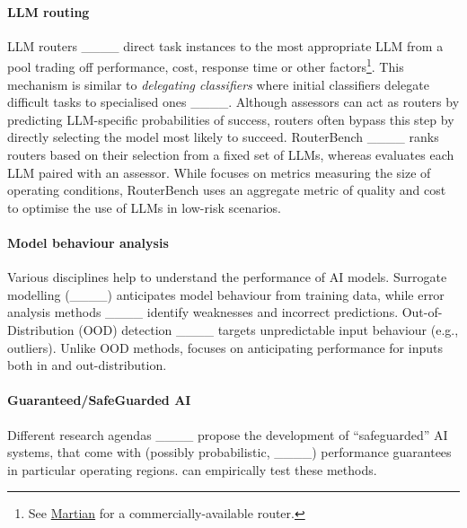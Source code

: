 \paragraph{LLM routing}
LLM routers ____
direct task instances to the most appropriate LLM from a pool 
trading off performance, cost, response time or other factors\footnote{See \href{https://withmartian.com/}{Martian} for a commercially-available router.}.
This mechanism %
is similar to %
\textit{delegating classifiers}  where initial classifiers delegate difficult tasks to %
specialised ones 
____. Although assessors can act %
as routers by predicting LLM-specific probabilities of success, routers often bypass this step by directly selecting the model most likely to succeed. %
RouterBench ____ ranks routers based on their selection from a fixed set of LLMs, whereas \predbench evaluates each LLM paired with an  assessor.  %
While \predbench focuses on metrics %
measuring the size of operating conditions,  %
RouterBench uses an aggregate metric of %
quality and cost to optimise the use of %
LLMs in low-risk scenarios.


\paragraph{Model behaviour analysis} Various disciplines  %
help %
to understand the performance of %
AI models. %
 Surrogate modelling %
(____) %
anticipates model behaviour from training data, while %
error analysis methods ____ %
identify %
weaknesses and %
incorrect predictions. Out-of-Distribution (OOD) detection ____ targets %
unpredictable input behaviour (e.g., outliers). Unlike OOD methods, %
\predbench focuses on %
anticipating performance for inputs both in and out-distribution.





\paragraph{Guaranteed/SafeGuarded AI} Different research agendas ____ propose the development of ``safeguarded'' AI systems, that come with (possibly probabilistic, ____) performance guarantees in particular operating regions. \predbench can empirically test these methods.